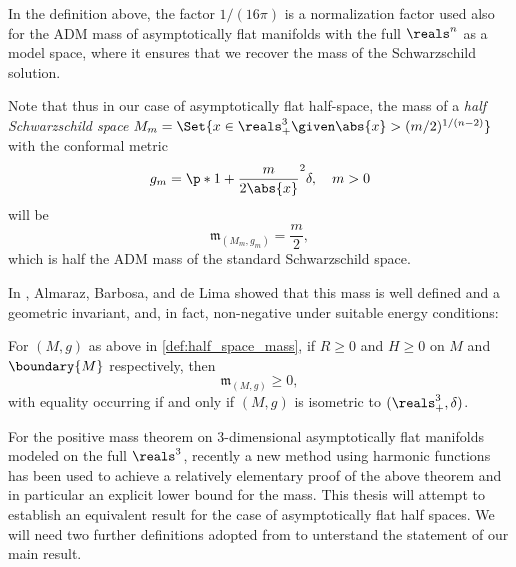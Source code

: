 \documentclass[titlepage,numbers=noenddot,headinclude,oneside,%
footinclude=true,cleardoublepage=empty,%
BCOR=5mm,paper=a4,fontsize=11pt,%
english,%
]{scrartcl}
\newcommand{\mass}[2]{\mathfrak{m}_{(#1,#2)}} %
\begin{document}
\begin{remark}\label{rem:mass_normalization}
    In the definition above, the factor \( 1/(16\pi) \)  is a normalization factor used also for the ADM mass of asymptotically flat manifolds with the full \( \reals^n \) as a model space, where it ensures that we recover the mass of the Schwarzschild solution. 
    
    Note that thus in our case of asymptotically flat half-space, the mass of a \emph{half Schwarzschild space} \( M_m=\Set{x\in \reals^3_+\given \abs{x}>(m/2)^{1/(n-2)}} \) with the conformal metric
    \begin{equation*}
        g_m=\p*{1+\frac{m}{2\abs{x}}}^{2}\delta,\quad m>0
    \end{equation*}
    will be
    \begin{equation*}
        \mass{M_m}{g_m}=\frac{m}{2},
    \end{equation*}
    which is half the ADM mass of the standard Schwarzschild space.
\end{remark}
In \cite{almarazPositiveMassTheorem2016}, Almaraz, Barbosa, and de Lima showed that this mass is well defined and a geometric invariant, and, in fact, non-negative under suitable energy conditions:
\begin{theorem}\label{thm:positive_mass_theorem_for_half_spaces}
    For \( (M,g) \) as above in \cref{def:half_space_mass}, if \( R\geq 0 \) and \( H\geq 0 \) on \( M \) and \( \boundary{M} \) respectively, then
    \begin{equation*}
        \mass{M}{g}\geq 0,
    \end{equation*}  
    with equality occurring if and only if \( (M,g) \) is isometric to \( (\reals^3_+,\delta) \).
\end{theorem}
For the positive mass theorem on 3-dimensional asymptotically flat manifolds modeled on the full \( \reals^3 \), recently \parencite{brayHarmonicFunctionsMass2019} a new method using harmonic functions has been used to achieve a relatively elementary proof of the above theorem and in particular an explicit lower bound for the mass. This thesis will attempt to establish an equivalent result for the case of asymptotically flat half spaces. We will need two further definitions adopted from \cite{eichmairDoublingAsymptoticallyFlat2023} to unterstand the statement of our main result.
\end{document}
